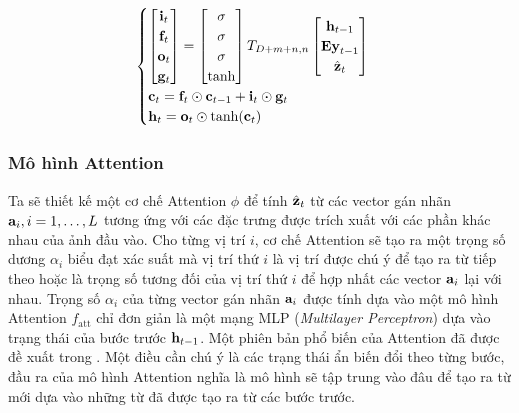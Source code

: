\documentclass[14pt, a4paper]{article}
\numberwithin{equation}{section}
\numberwithin{algorithm}{section}
\numberwithin{figure}{section}
\numberwithin{dl}{section}
\numberwithin{md}{section}
\numberwithin{bd}{section}
\numberwithin{dn}{section}
\numberwithin{hq}{section}
\begin{document}
    \begin{equation}
        \begin{cases}
            \begin{bmatrix}
                \bold{i}_t \\
                \bold{f}_t \\
                \bold{o}_t \\
                \bold{g}_t
            \end{bmatrix}=\begin{bmatrix}
                \sigma \\
                \sigma \\
                \sigma \\
                \mathrm{tanh}
            \end{bmatrix}T_{D+m+n,n}\begin{bmatrix}
                \bold{h}_{t-1} \\
                \bold{Ey}_{t-1} \\
                \hat{\bold{z}}_t
            \end{bmatrix} \\
            \bold{c}_t = \bold{f}_t \odot\bold{c}_{t-1} + \bold{i}_t \odot \bold{g}_t \\
            \bold{h}_t = \bold{o}_t \odot \mathrm{tanh}(\bold{c}_t)
        \end{cases}
    \end{equation}

    \subsubsection{Mô hình Attention}

    Ta sẽ thiết kế một cơ chế Attention $\phi$ để tính $\hat{\bold{z}}_t$ từ các vector gán nhãn $\bold{a}_i, i=1, \dots, L$ tương ứng với các đặc trưng được trích xuất với các phần khác nhau của ảnh đầu vào.
    Cho từng vị trí $i$, cơ chế Attention sẽ tạo ra một trọng số dương $\alpha_i$ biểu đạt xác suất mà vị trí thứ $i$ là vị trí được chú ý để tạo ra từ tiếp theo hoặc là trọng số tương đối của vị trí thứ $i$ để hợp nhất các vector $\bold{a}_i$ lại với nhau.
    Trọng số $\alpha_i$ của từng vector gán nhãn $\bold{a}_i$ được tính dựa vào một mô hình Attention $f_{\mathrm{att}}$ chỉ đơn giản là một mạng MLP (\textit{Multilayer Perceptron}) dựa vào trạng thái của bước trước $\bold{h}_{t-1}$.
    Một phiên bản phổ biến của Attention đã được đề xuất trong \cite{bahdanau2014neural}. Một điều cần chú ý là các trạng thái ẩn biến đổi theo từng bước, đầu ra của mô hình Attention nghĩa là mô hình sẽ tập trung vào đâu để tạo ra từ mới dựa vào những từ đã được tạo ra từ các bước trước.
\end{document}
